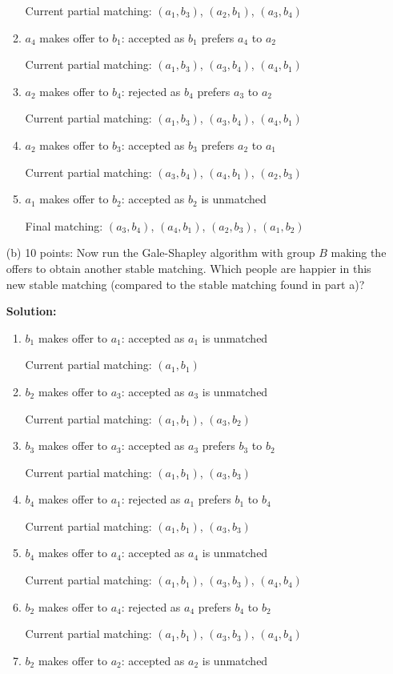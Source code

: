 \documentclass[12pt]{article}
\begin{document}
\begin{enumerate}
\begin{enumerate}
Current partial matching: $(a_1,b_3)$, $(a_2,b_1)$, $(a_3,b_4)$
\item $a_4$ makes offer to $b_1$: accepted as $b_1$ prefers $a_4$ to $a_2$

Current partial matching: $(a_1,b_3)$, $(a_3,b_4)$, $(a_4,b_1)$
\item $a_2$ makes offer to $b_4$: rejected as $b_4$ prefers $a_3$ to $a_2$

Current partial matching: $(a_1,b_3)$, $(a_3,b_4)$, $(a_4,b_1)$
\item $a_2$ makes offer to $b_3$: accepted as $b_3$ prefers $a_2$ to $a_1$

Current partial matching: $(a_3,b_4)$, $(a_4,b_1)$, $(a_2,b_3)$
\item $a_1$ makes offer to $b_2$: accepted as $b_2$ is unmatched

Final matching: $(a_3,b_4)$, $(a_4,b_1)$, $(a_2,b_3)$, $(a_1,b_2)$
\end{enumerate}

\item[(b)] 10 points: Now run the Gale-Shapley algorithm with group $B$ making the offers to obtain another stable matching. Which people are happier in this new stable matching (compared to the stable matching found in part a)?

\textbf{Solution:}
\begin{enumerate}
\item $b_1$ makes offer to $a_1$: accepted as $a_1$ is unmatched

Current partial matching: $(a_1,b_1)$
\item $b_2$ makes offer to $a_3$: accepted as $a_3$ is unmatched

Current partial matching: $(a_1,b_1)$, $(a_3,b_2)$
\item $b_3$ makes offer to $a_3$: accepted as $a_3$ prefers $b_3$ to $b_2$

Current partial matching: $(a_1,b_1)$, $(a_3,b_3)$
\item $b_4$ makes offer to $a_1$: rejected as $a_1$ prefers $b_1$ to $b_4$

Current partial matching: $(a_1,b_1)$, $(a_3,b_3)$
\item $b_4$ makes offer to $a_4$: accepted as $a_4$ is unmatched

Current partial matching: $(a_1,b_1)$, $(a_3,b_3)$, $(a_4,b_4)$
\item $b_2$ makes offer to $a_4$: rejected as $a_4$ prefers $b_4$ to $b_2$

Current partial matching: $(a_1,b_1)$, $(a_3,b_3)$, $(a_4,b_4)$
\item $b_2$ makes offer to $a_2$: accepted as $a_2$ is unmatched


\end{enumerate}
\end{enumerate}
\end{document}
